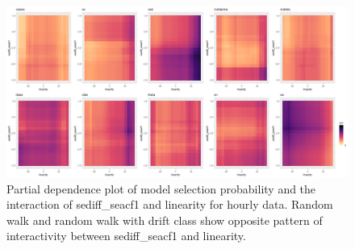 \documentclass[11pt,a4paper,]{article}
\begin{document}
\begin{figure}
\centering
\includegraphics{figures/htwopdp-1.png}
\caption{\label{fig:htwopdp}Partial dependence plot of model selection
probability and the interaction of sediff\_seacf1 and linearity for
hourly data. Random walk and random walk with drift class show opposite
pattern of interactivity between sediff\_seacf1 and linearity.}
\end{figure}

\newpage

\printbibliography[title=References]
\end{document}
